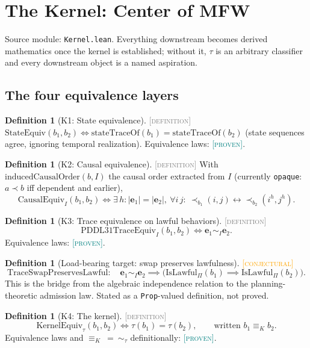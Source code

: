\documentclass[11pt]{article}
\newcommand{\PROVEN}{\textcolor{teal}{\textsc{[proven]}}}
\newcommand{\DEFINITION}{\textcolor{gray}{\textsc{[definition]}}}
\newcommand{\CONJECTURAL}{\textcolor{orange}{\textsc{[conjectural]}}}
\newcommand{\PT}{\Pi}                          %
\newcommand{\tmap}{\tau}                       %
\newcommand{\kerEq}{\equiv_{K}}                %
\newcommand{\traceEq}[1]{\sim_{#1}}            %
\theoremstyle{plain}
\theoremstyle{definition}
\newtheorem{definition}[theorem]{Definition}
\begin{document}
\section{The Kernel: Center of MFW}
\label{sec:kernel}
Source module: \texttt{Kernel.lean}. Everything downstream becomes derived
mathematics once the kernel is established; without it, $\tmap$ is an
arbitrary classifier and every downstream object is a named aspiration.

\subsection{The four equivalence layers}

\begin{definition}[K1: State equivalence]\DEFINITION\;
$\mathrm{StateEquiv}(b_1, b_2) \iff
\mathrm{stateTraceOf}(b_1) = \mathrm{stateTraceOf}(b_2)$ (state sequences
agree, ignoring temporal realization). Equivalence laws: \PROVEN.
\end{definition}

\begin{definition}[K2: Causal equivalence]\DEFINITION\;
With $\mathrm{inducedCausalOrder}(b, I)$ the causal order extracted from $I$
(currently \texttt{opaque}: $a \prec b$ iff dependent and earlier),
\[
  \mathrm{CausalEquiv}_I(b_1, b_2) \iff
  \exists\, h : |\mathbf{e}_1| = |\mathbf{e}_2|,\
  \forall i\, j:\
  \prec_{b_1}(i,j) \leftrightarrow \prec_{b_2}(i^h, j^h).
\]
\end{definition}

\begin{definition}[K3: Trace equivalence on lawful behaviors]\DEFINITION\;
\[
  \mathrm{PDDL31TraceEquiv}_I(b_1, b_2) \iff
  \mathbf{e}_1 \traceEq{I} \mathbf{e}_2 .
\]
Equivalence laws: \PROVEN.
\end{definition}

\begin{definition}[Load-bearing target: swap preserves lawfulness]
\CONJECTURAL\;
\[
  \mathrm{TraceSwapPreservesLawful}:\quad
  \mathbf{e}_1 \traceEq{I} \mathbf{e}_2 \implies
  \big(\mathrm{IsLawful}_\PT(b_1) \implies \mathrm{IsLawful}_\PT(b_2)\big).
\]
This is the bridge from the algebraic independence relation to the
planning-theoretic admission law. Stated as a \texttt{Prop}-valued
definition, not proved.
\end{definition}

\begin{definition}[K4: The kernel]\DEFINITION\;
\[
  \mathrm{KernelEquiv}_\tmap(b_1, b_2) \iff \tmap(b_1) = \tmap(b_2),
  \qquad\text{written } b_1 \kerEq b_2 .
\]
Equivalence laws and $\kerEq\ =\ \sim_\tmap$ definitionally: \PROVEN.
\end{definition}
\end{document}
